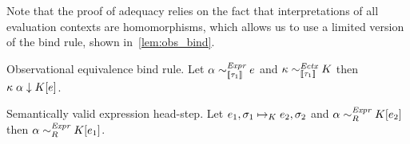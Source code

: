 Note that the proof of adequacy relies on the fact that
interpretations of all evaluation contexts are homomorphisms, which
allows us to use a limited version of the bind rule, shown in~\cref{lem:obs_bind}.

\begin{lemma}{Observational equivalence bind rule.}
  \label{lem:obs_bind}
  \newline
  Let $\alpha \sim_{\sem{\tau_1}}^{\Expr} \expr$ and $\kappa \sim_{\sem{\tau_1}}^{\Ectx} K$
  then $\eapp{\kappa}{\alpha} \downarrow \plug{K}{\expr}$.
\end{lemma}

\begin{lemma}{Semantically valid expression head-step.}
  \label{lem:step}
  \newline
  Let $\contrA{\expr_1, \sigma_1}{\expr_2, \sigma_2}{K}$ and $\alpha \sim_{R}^{\Expr} \plug{K}{\expr_2}$
  then $\alpha \sim_{R}^{\Expr} \plug{K}{\expr_1}$.
\end{lemma}

